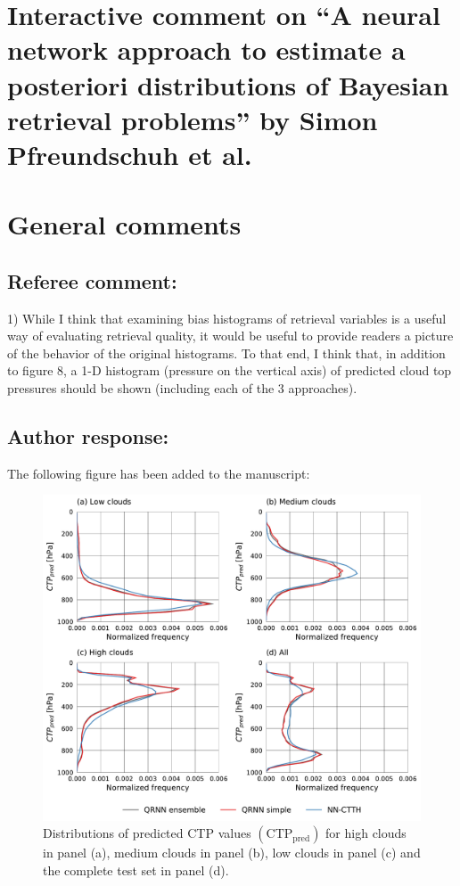 \documentclass[journal abbreviation, manuscript]{copernicus}
\author{simon}
\date{\today}
\title{}
\begin{document}
\setlength{\parindent}{0cm}

\section*{Interactive comment on ``A neural network approach to estimate a posteriori distributions of Bayesian retrieval problems'' by Simon Pfreundschuh et al.}

\section{General comments}

\subsection*{Referee comment:}

1) While I think that examining bias histograms of retrieval variables is a useful way
of  evaluating  retrieval quality,  it  would be  useful to  provide readers  a picture  of the
behavior of the original histograms.  To that end, I think that, in addition to figure 8, a
1-D histogram (pressure on the vertical axis) of predicted cloud top pressures should
be shown (including each of the 3 approaches).

\subsection*{Author response:}

The following figure has been added to the manuscript:


\vspace{1em}

\begin{figure}[htbp!]
  \centering
  \includegraphics[width = 0.8\linewidth]{../plots/fig09}
  \caption{Distributions of predicted CTP values $(\text{CTP}_{\text{pred}})$ 
    for high clouds in panel (a), medium clouds in panel (b), low
    clouds in panel (c) and the complete test set in panel (d).}
  \label{fig:ctp_results_p_dist}
\end{figure}
\end{document}
